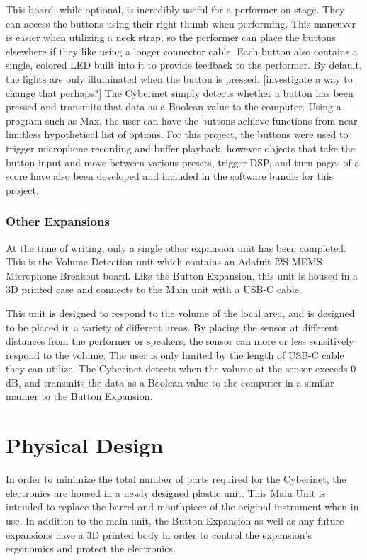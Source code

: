 This board, while optional, is incredibly useful for a performer on stage. They can access the buttons using their right thumb when performing. This maneuver is easier when utilizing a neck strap, so the performer can place the buttons elsewhere if they like using a longer connector cable. Each button also contains a single, colored LED built into it to provide feedback to the performer. By default, the lights are only illuminated when the button is pressed. [investigate a way to change that perhaps?] The Cyberinet simply detects whether a button has been pressed and transmits that data as a Boolean value to the computer. Using a program such as Max, the user can have the buttons achieve functions from near limitless hypothetical list of options. For this project, the buttons were used to trigger microphone recording and buffer playback, however objects that take the button input and move between various presets, trigger DSP, and turn pages of a score have also been developed and included in the software bundle for this project.

\subsubsection{Other Expansions}
At the time of writing, only a single other expansion unit has been completed. This is the Volume Detection unit which contains an Adafuit I2S MEMS Microphone Breakout board. Like the Button Expansion, this unit is housed in a 3D printed case and connects to the Main unit with a USB-C cable. 

This unit is designed to respond to the volume of the local area, and is designed to be placed in a variety of different areas. By placing the sensor at different distances from the performer or speakers, the sensor can more or less sensitively respond to the volume. The user is only limited by the length of USB-C cable they can utilize. The Cyberinet detects when the volume at the sensor exceeds 0 dB, and transmits the data as a Boolean value to the computer in a similar manner to the Button Expansion.

\section{Physical Design}
In order to minimize the total number of parts required for the Cyberinet, the electronics are housed in a newly designed plastic unit. This Main Unit is intended to replace the barrel and mouthpiece of the original instrument when in use. In addition to the main unit, the Button Expansion as well as any future expansions have a 3D printed body in order to control the expansion's ergonomics and protect the electronics.

